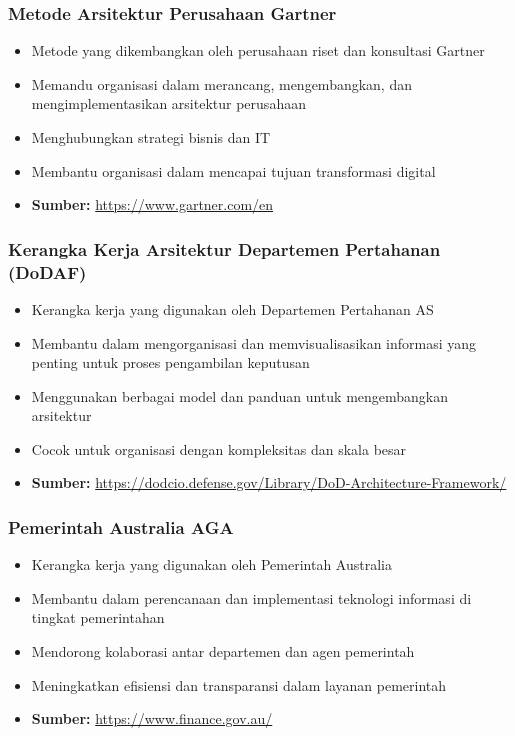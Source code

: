 \documentclass{beamer}
\begin{document}
	\begin{frame}
		\frametitle{Metode Arsitektur Perusahaan Gartner}
		\begin{itemize}
			\item Metode yang dikembangkan oleh perusahaan riset dan konsultasi Gartner
			\item Memandu organisasi dalam merancang, mengembangkan, dan mengimplementasikan arsitektur perusahaan
			\item Menghubungkan strategi bisnis dan IT
			\item Membantu organisasi dalam mencapai tujuan transformasi digital
			\item \textbf{Sumber:} \url{https://www.gartner.com/en}
		\end{itemize}
	\end{frame}
	
	\begin{frame}
		\frametitle{Kerangka Kerja Arsitektur Departemen Pertahanan (DoDAF)}
		\begin{itemize}
			\item Kerangka kerja yang digunakan oleh Departemen Pertahanan AS
			\item Membantu dalam mengorganisasi dan memvisualisasikan informasi yang penting untuk proses pengambilan keputusan
			\item Menggunakan berbagai model dan panduan untuk mengembangkan arsitektur
			\item Cocok untuk organisasi dengan kompleksitas dan skala besar
			\item \textbf{Sumber:} \url{https://dodcio.defense.gov/Library/DoD-Architecture-Framework/}
		\end{itemize}
	\end{frame}
	
	\begin{frame}
		\frametitle{Pemerintah Australia AGA}
		\begin{itemize}
			\item Kerangka kerja yang digunakan oleh Pemerintah Australia
			\item Membantu dalam perencanaan dan implementasi teknologi informasi di tingkat pemerintahan
			\item Mendorong kolaborasi antar departemen dan agen pemerintah
			\item Meningkatkan efisiensi dan transparansi dalam layanan pemerintah
			\item \textbf{Sumber:} \url{https://www.finance.gov.au/}
		\end{itemize}
	\end{frame}
	
\end{document}
